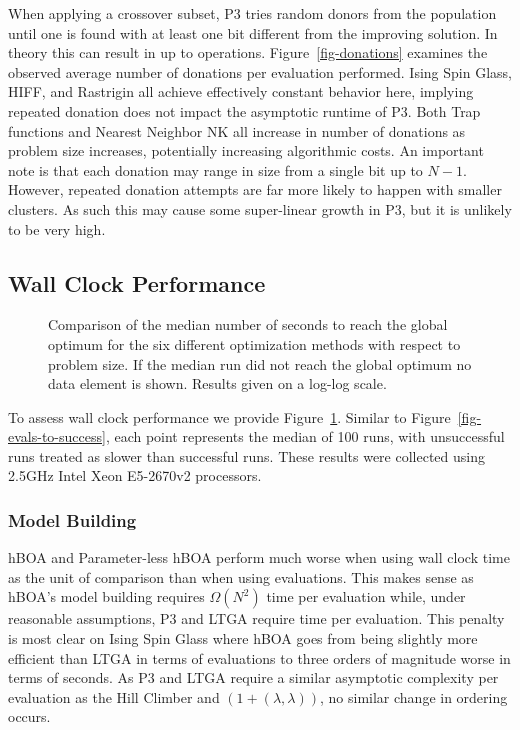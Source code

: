 When applying a crossover subset, P3 tries random donors from the population until one is found with at least
one bit different from the improving solution. In theory this can result in up to \BigO{\mu} operations.
Figure~\ref{fig-donations} examines the observed average number of donations per evaluation performed.
Ising Spin Glass, HIFF, and Rastrigin all achieve effectively constant behavior here, implying repeated
donation does not impact the asymptotic runtime of P3. Both Trap functions and Nearest Neighbor NK all
increase in number of donations as problem size increases, potentially increasing algorithmic costs. An
important note is that each donation may range in size from a single bit up to $N-1$. However,
repeated donation attempts are far more likely to happen with smaller clusters.
As such this may cause some super-linear growth
in P3, but it is unlikely to be very high.

\subsection{Wall Clock Performance}
\begin{figure}
  \begin{center}
  \end{center}
  \caption{Comparison of the median number of seconds to reach the global optimum for
           the six different optimization methods with respect
           to problem size.  If the median run did not reach the global optimum no data element
           is shown.  Results given on a log-log scale.}
  \label{fig-seconds-to-success}
\end{figure}


To assess wall clock performance we provide Figure~\ref{fig-seconds-to-success}.
Similar to Figure~\ref{fig-evals-to-success}, each point represents the median
of 100 runs, with unsuccessful runs treated as slower than successful runs.
These results were collected using 2.5GHz Intel Xeon E5-2670v2 processors.

\subsubsection{Model Building}
hBOA and Parameter-less hBOA perform much worse when using wall clock time as the unit of comparison than when using
evaluations. This makes sense as hBOA's model building requires $\Omega(N^2)$ time per evaluation while, under reasonable
assumptions, P3 and LTGA require  time per evaluation. This penalty is most clear on Ising Spin Glass where
hBOA goes from being slightly more efficient than LTGA in terms of evaluations to three orders of magnitude worse in terms of seconds.
As P3 and LTGA require a similar asymptotic complexity per
evaluation as the Hill Climber and $(1+(\lambda, \lambda))$, no similar change in ordering occurs.

